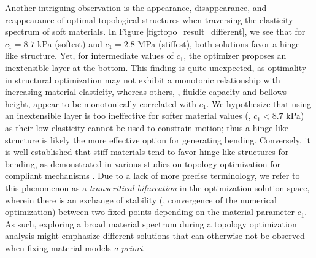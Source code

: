 Another intriguing observation is the appearance, disappearance, and reappearance of optimal topological structures when traversing the elasticity spectrum of soft materials. In Figure \ref{fig:topo_result_different}, we see that for $c_1 = 8.7$ kPa (softest) and $c_1 = 2.8$ MPa (stiffest), both solutions favor a hinge-like structure. Yet, for intermediate values of $c_1$, the optimizer proposes an inextensible layer at the bottom. This finding is quite unexpected, as optimality in structural optimization may not exhibit a monotonic relationship with increasing material elasticity, whereas others, \eg, fluidic capacity and bellows height, appear to be monotonically correlated with $c_1$. We hypothesize that using an inextensible layer is too ineffective for softer material values (\ie, $c_1 < 8.7$ kPa) as their low elasticity cannot be used to constrain motion; thus a hinge-like structure is likely the more effective option for generating bending. Conversely, it is well-established that stiff materials tend to favor hinge-like structures for bending, as demonstrated in various studies on topology optimization for compliant mechanisms \cite{Bendsoe2003, Zhang2017Topo, Luo2016Mar}. Due to a lack of more precise terminology, we refer to this phenomenon as a \textit{transcritical bifurcation} in the optimization solution space, wherein there is an exchange of stability (\ie, convergence of the numerical optimization) between two fixed points depending on the material parameter $c_1$. As such, exploring a broad material spectrum during a topology optimization analysis might emphasize different solutions that can otherwise not be observed when fixing material models \textit{a-priori}.